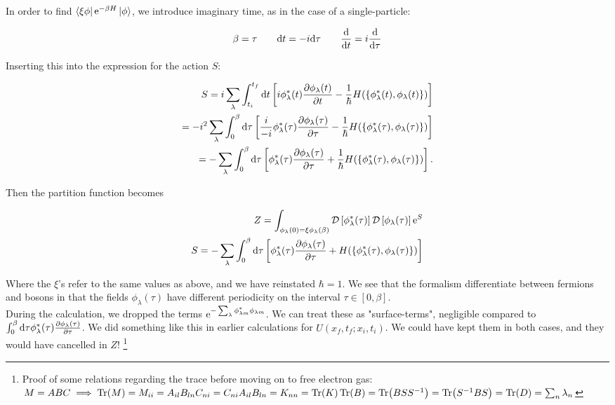 In order to find $\bra{\xi \phi} \mathrm{e}^{-\beta H} \ket{\phi}$, we introduce imaginary time, as in the case of a single-particle: 

\begin{align*}
    \beta = \tau \quad \quad \dd t = -i \dd \tau \quad \quad 
    \dv{}{t} = i \dv{}{\tau} 
\end{align*}

Inserting this into the expression for the action $S$: 

\begin{align*}
    S = i \sum_{\lambda} \int_{t_{i}}^{t_{f}} \dd t \left[ i \phi_{\lambda}^{*}(t) \pdv{\phi_{\lambda}(t)}{t} - \frac{1}{\hbar}H(\{\phi_{\lambda}^{*}(t), \phi_{\lambda} (t)\} )  \right] \\ = - i^{2} \sum_{\lambda} \int_{0}^{\beta} \dd \tau \left[ \frac{i}{-i} \phi_{\lambda}^{*}(\tau) \pdv{\phi_{\lambda}(\tau)}{\tau} - \frac{1}{\hbar}H(\{\phi_{\lambda}^{*}(\tau), \phi_{\lambda} (\tau)\} )  \right] \\ = - \sum_{\lambda} \int_{0}^{\beta} \dd \tau \left[\phi_{\lambda}^{*}(\tau) \pdv{\phi_{\lambda}(\tau)}{\tau} + \frac{1}{\hbar}H(\{\phi_{\lambda}^{*}(\tau), \phi_{\lambda} (\tau)\} )  \right]. 
\end{align*} 

Then the partition function becomes 

\begin{align}
    Z = \int_{\phi_{\lambda}(0) = \xi\phi_{\lambda}(\beta)} \mathcal{D} \left[\phi_{\lambda}^{*}(\tau)\right] \mathcal{D} \left[ \phi_{\lambda} (\tau)\right] \mathrm{e}^{S} \\
    S = - \sum_{\lambda} \int_{0}^{\beta} \dd \tau \left[\phi_{\lambda}^{*}(\tau) \pdv{\phi_{\lambda}(\tau)}{\tau} + H(\{\phi_{\lambda}^{*}(\tau), \phi_{\lambda} (\tau)\} )  \right] \nonumber
\end{align}

Where the $\xi$'s refer to the same values as above, and we have reinstated $\hbar = 1$. We see that the formalism differentiate between fermions and bosons in that the fields $\phi_{\lambda}(\tau)$ have different periodicity on the interval $ \tau \in [0, \beta]$. \\

During the calculation, we dropped the terms $\mathrm{e}^{-\sum_{\lambda} \phi_{\lambda m}^{*}\phi_{\lambda m}}$. We can treat these as "surface-terms", negligible compared to $\int_{0}^{\beta} \dd \tau \phi_{\lambda}^{*}(\tau) \pdv{\phi_{\lambda}(\tau)}{\tau}$. We did something like this in earlier calculations for $U(x_{f}, t_{f}; x_{i}, t_{i})$. We could have kept them in both cases, and they would have cancelled in $Z$! 
\footnote{Proof of some relations regarding the trace before moving on to free electron gas: $M = ABC \implies \Tr(M) = M_{ii} = A_{il}B_{ln}C_{ni} = C_{ni}A_{il}B_{ln} = K_{nn} = \Tr(K) 
    \Tr(B) = \Tr(BSS^{-1}) = \Tr(S^{-1}BS) = \Tr(D) = \sum_{n} \lambda_{n}$}


